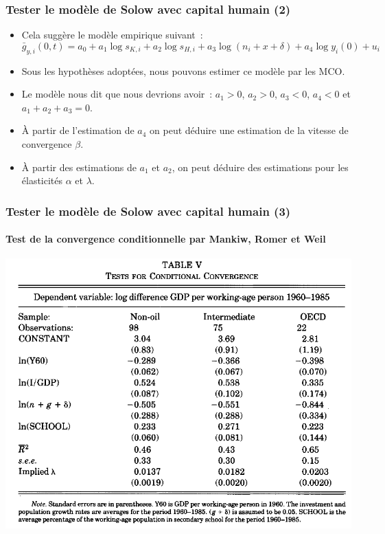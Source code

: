 \documentclass[10pt,notheorems]{beamer}
\theoremstyle{plain}
\theoremstyle{definition} %
\begin{document}
\begin{frame}
  \frametitle{Tester le modèle de Solow avec capital humain (2)}

  \begin{itemize}

  \item Cela suggère le modèle empirique suivant~:
    \[
      \bar g_{y,i}(0,t) = a_0 + a_1 \log s_{K,i} + a_2 \log s_{H,i} + a_3 \log (n_i+x+\delta) + a_4 \log y_i(0) + u_i 
    \]

    \medskip
    
  \item Sous les hypothèses adoptées, nous pouvons estimer ce modèle par les MCO.\newline

  \item Le modèle nous dit que nous devrions avoir~: $a_1>0$, $a_2>0$, $a_3<0$,
    $a_4<0$ et $a_1+a_2+a_3=0$.\newline

  \item À partir de l'estimation de $a_4$ on peut déduire une estimation de la vitesse de convergence $\beta$.\newline

  \item À partir des estimations de $a_1$ et $a_2$, on peut déduire des estimations pour les élasticités $\alpha$ et $\lambda$.
    
  \end{itemize}
\end{frame}


\begin{frame}
  \frametitle{Tester le modèle de Solow avec capital humain (3)}
  \framesubtitle{Test de la convergence conditionnelle par Mankiw, Romer et Weil}

  \begin{center}
    \includegraphics[scale=.40]{../img/mrw-table-5.png}
  \end{center}


\end{frame}
\end{document}
